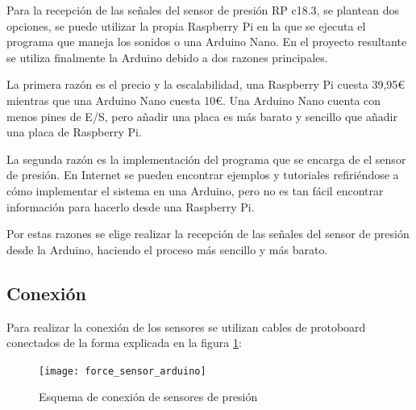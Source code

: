         Para la recepción de las señales del sensor de presión RP c18.3, se plantean dos opciones, se puede utilizar
        la propia Raspberry Pi en la que se ejecuta el programa que maneja los sonidos o una Arduino Nano. En el
        proyecto resultante se utiliza finalmente la Arduino debido a dos razones principales.\newline

        La primera razón es el precio y la escalabilidad, una Raspberry Pi cuesta 39,95\euro{} mientras que una
        Arduino Nano cuesta 10\euro{}. Una Arduino Nano cuenta con menos pines de E/S, pero añadir una placa es más
        barato y sencillo que añadir una placa de Raspberry Pi.\newline

        La segunda razón es la implementación del programa que se encarga de el sensor de presión. En Internet se
        pueden encontrar ejemplos y tutoriales refiriéndose a cómo implementar el sistema en una Arduino, pero no
        es tan fácil encontrar información para hacerlo desde una Raspberry Pi.\newline

        Por estas razones se elige realizar la recepción de las señales del sensor de presión desde la Arduino,
        haciendo el proceso más sencillo y más barato.

        \subsection{Conexión} %
        \label{sub:Conexion}

            Para realizar la conexión de los sensores se utilizan cables de protoboard conectados de la forma
            explicada en la figura \ref{fig:EsquemaConexion}:

            \begin{figure}[ht]
                \centering
                \texttt{[image: force\_sensor\_arduino]}
                \caption{Esquema de conexión de sensores de presión\cite{force_sensor_arduino}
                         \label{fig:EsquemaConexion}}
            \end{figure}
        


